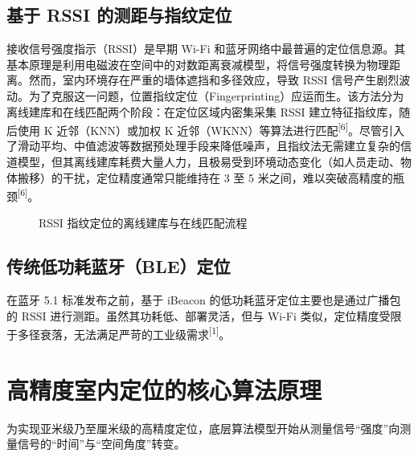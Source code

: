 \documentclass[UTF8,a4paper,12pt]{ctexart}
\newcommand{\refmark}[1]{\textsuperscript{[#1]}}
\begin{document}
\subsection{基于 RSSI 的测距与指纹定位}
接收信号强度指示（RSSI）是早期 Wi-Fi 和蓝牙网络中最普遍的定位信息源。其基本原理是利用电磁波在空间中的对数距离衰减模型，将信号强度转换为物理距离。然而，室内环境存在严重的墙体遮挡和多径效应，导致 RSSI 信号产生剧烈波动。为了克服这一问题，位置指纹定位（Fingerprinting）应运而生。该方法分为离线建库和在线匹配两个阶段：在定位区域内密集采集 RSSI 建立特征指纹库，随后使用 K 近邻（KNN）或加权 K 近邻（WKNN）等算法进行匹配\refmark{6}。尽管引入了滑动平均、中值滤波等数据预处理手段来降低噪声，且指纹法无需建立复杂的信道模型，但其离线建库耗费大量人力，且极易受到环境动态变化（如人员走动、物体搬移）的干扰，定位精度通常只能维持在 3 至 5 米之间，难以突破高精度的瓶颈\refmark{6}。
\begin{figure}[htbp]
\centering
{}
\caption{RSSI 指纹定位的离线建库与在线匹配流程}
\label{fig:rssi}
\end{figure}
\subsection{传统低功耗蓝牙（BLE）定位}
在蓝牙 5.1 标准发布之前，基于 iBeacon 的低功耗蓝牙定位主要也是通过广播包的 RSSI 进行测距。虽然其功耗低、部署灵活，但与 Wi-Fi 类似，定位精度受限于多径衰落，无法满足严苛的工业级需求\refmark{1}。

\section{高精度室内定位的核心算法原理}
为实现亚米级乃至厘米级的高精度定位，底层算法模型开始从测量信号“强度”向测量信号的“时间”与“空间角度”转变。
\end{document}
